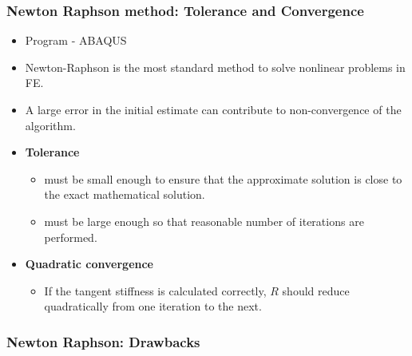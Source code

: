 \documentclass[notes]{beamer}
\begin{document}


\begin{frame}
\frametitle{Newton Raphson method: Tolerance and Convergence}
\begin{itemize}
	\item Program - ABAQUS
	\item Newton-Raphson is the most standard method to solve nonlinear problems in FE.
	\item A large error in the initial estimate can contribute to non-convergence of the algorithm.
	\item \textbf{Tolerance}
	\begin{itemize}
		\item must be small enough to ensure that the approximate
		solution is close to the exact mathematical solution.
		\item must be large enough so that reasonable number of
		iterations are performed.
	\end{itemize}
	\item \textbf{Quadratic convergence}
	\begin{itemize}
		\item If the tangent stiffness is calculated correctly, $R$ should
		reduce quadratically from one iteration to the next.
	\end{itemize}
\end{itemize}
\end{frame}

\begin{frame}
\frametitle{Newton Raphson: Drawbacks}
\end{frame}
\end{document}
